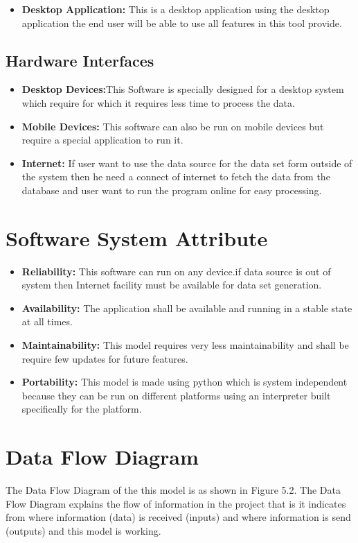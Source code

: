 \documentclass[openany,12pt]{report}
\begin{document}
\begin{itemize}
\item{\textbf{Desktop Application:}  This is a desktop application using the desktop application the end user will be able to use all features in this tool provide. }

\end{itemize}

\subsection{Hardware Interfaces}
\begin{itemize}
\item{\textbf{Desktop Devices:}This Software is specially designed for a desktop system which require for which it requires less time to process the data.}
\item{\textbf{Mobile Devices:} This software can also be run on mobile devices but require a special application to run it.}
\item{\textbf{Internet:}  If user want to use the data source for the data set form outside of the system then he need a connect of internet to fetch the data from the database and user want to run the program online for easy processing. }
\end{itemize}


\section{Software System Attribute}
\begin{itemize}
\item{\textbf{Reliability:} This software can run on any device.if data source is out of system then Internet facility must be available for data set generation.}
\item{\textbf{Availability:} The application shall be available and running in a stable state at all times.}
\item{\textbf{Maintainability:}  This model requires very less maintainability and shall be require few updates for future features.}
\item{\textbf{Portability:}  This model is made using python which is system independent because they can be run on different platforms using an interpreter built specifically for the platform.}

\end{itemize}

\newpage
\section{Data Flow Diagram}
The Data Flow Diagram of the this model is as shown in Figure 5.2. The Data Flow Diagram explains the flow of information in the project that is it indicates from where information (data) is received (inputs) and where information is send (outputs) and this model is working.\\
\end{document}
